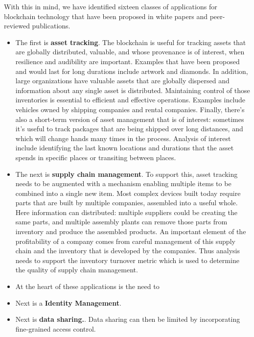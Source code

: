 With this in mind, we have identified sixteen classes of applications for blockchain technology that have been proposed in white papers and peer-reviewed publications.


\begin{itemize}
\item The first is \textbf{asset tracking}.  The blockchain is useful for tracking assets that are globally distributed, valuable, and whose provenance is of interest, when resilience and audibility are important.  Examples that have been proposed and would last for long durations include artwork and diamonds.  In addition, large organizations have valuable assets that are globally dispersed and information about any single asset is distributed.  Maintaining control of those inventories is essential to efficient and effective operations.  Examples include vehicles owned by shipping companies and rental companies.  Finally, there's also a short-term version of asset management that is of interest: sometimes it's useful to track packages that are being shipped over long distances, and which will change hands many times in the process.  Analysis of interest include identifying the last known locations and durations that the asset spends in specific places or transiting between places.

\item The next is \textbf{supply chain management}.  To support this, asset tracking needs to be augmented with a mechanism enabling multiple items to be combined into a single new item.  Most complex devices built today require parts that are built by multiple companies, assembled into a useful whole. Here information can distributed: multiple suppliers could be creating the same parts, and multiple assembly plants can remove those parts from inventory and produce the assembled products.  An important element of the profitability of a company comes from careful management of this supply chain and the inventory that is developed by the companies.  Thus analysis needs to support the inventory turnover metric which is used to determine the quality of supply chain management.

\item At the heart of these applications is the need to 

\item{Next is a \textbf{Identity Management}.  }

\item{Next is \textbf{data sharing.}.  Data sharing can then be limited by incorporating fine-grained access control.}


\end{itemize}
